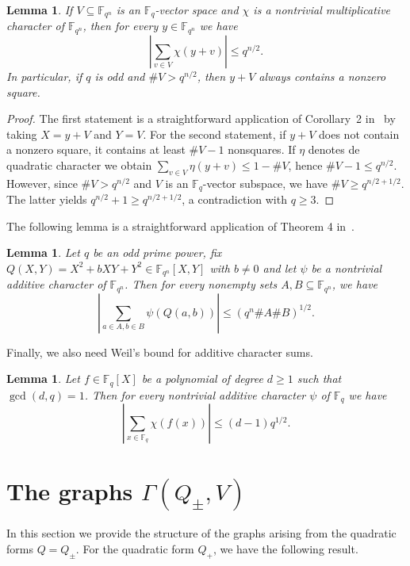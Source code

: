 \documentclass[11pt]{amsart}
\newcommand{\G}{\Gamma}
\newcommand{\F}{\mathbb F}
\newtheorem{lemma}[theorem]{Lemma}
\theoremstyle{definition}
\theoremstyle{remark}
\begin{document}
\begin{lemma}\label{lem:boundaffine}
    If $V\subseteq \F_{q^n}$ is an $\F_q$-vector space and $\chi$ is a nontrivial multiplicative character of $\F_{q^n}$, then for every $y\in \F_{q^n}$ we have  
    $$\left |\sum_{v\in V}\chi(y+v)\right|\le q^{n/2}.$$
    In particular, if $q$ is odd and $\# V>q^{n/2}$, then $y+V$ always contains a nonzero square.
\end{lemma}

\begin{proof}
The first statement is a straightforward application of Corollary~2 in~\cite{GS} by taking $X=y+V$ and $Y=V$. For the second statement, if $y+V$ does not contain a nonzero square, it contains at least $\# V-1$ nonsquares. If $\eta$ denotes de quadratic character we obtain 
$\sum_{v\in V}\eta(y+v)\le 1-\# V$, hence 
$\# V-1\le q^{n/2}$. However, since $\# V>q^{n/2}$ and $V$ is an $\F_q$-vector subspace, we have $\# V\ge q^{n/2+1/2}$. The latter yields $q^{n/2}+1\ge q^{n/2+1/2}$, a contradiction with $q\ge 3$.
\end{proof}



The following lemma is a straightforward application of Theorem 4 in~\cite{GS}.

\begin{lemma}\label{lem:GS}
    Let $q$ be an odd prime power, fix $Q(X, Y)=X^2+bXY+Y^2\in \F_{q^n}[X, Y]$ with $b\ne 0$ and let $\psi$ be a nontrivial additive character of $\F_{q^n}$. Then for every nonempty sets $A, B\subseteq \F_{q^n}$, we have 
    $$\left|\sum_{a\in A, b\in B}\psi(Q(a, b))\right|\le (q^n\#A\#B)^{1/2}.$$
\end{lemma}

Finally, we also need Weil's bound for additive character sums.


\begin{lemma}\label{lem:weil}
    Let $f\in \F_q[X]$ be a polynomial of degree $d\ge 1$ such that $\gcd(d, q)=1$. Then for every nontrivial additive character $\psi$ of $\F_q$ we have
$$\left|\sum_{x\in \F_q}\chi(f(x))\right|\le (d-1)q^{1/2}.$$
    
\end{lemma}









\section{The graphs $\G(Q_{\pm}, V)$}
In this section we provide the structure of the graphs arising from the quadratic forms $Q=Q_{\pm}$. For the quadratic form $Q_+$, we have the following result.
\end{document}
